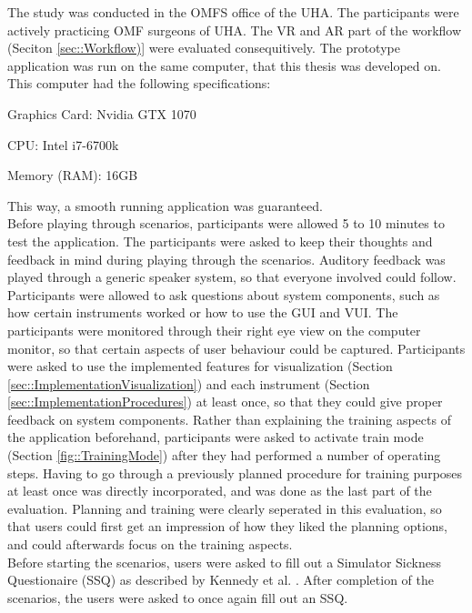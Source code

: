 The study was conducted in the OMFS office of the UHA.
The participants were actively practicing OMF surgeons of UHA.
The VR and AR part of the workflow (Seciton \ref{sec::Workflow)} 
were evaluated consequitively.
The prototype application was run on the same computer, that this 
thesis was developed on.
This computer had the following specifications:

\begin{compactenum}[label=(\alph*)]
    \item Graphics Card: Nvidia GTX 1070
    \item CPU: Intel i7-6700k
    \item Memory (RAM): 16GB
\end{compactenum}

This way, a smooth running application was guaranteed.
\\ Before playing through scenarios, participants were allowed 5 to 10 minutes to test the application.
The participants were asked to keep their thoughts and feedback in mind during playing through the scenarios.
Auditory feedback was played through a generic speaker system, so that everyone involved could follow.
Participants were allowed to ask questions about system components, such as how certain instruments worked or how to use the GUI and VUI.
The participants were monitored through their right eye view on the computer monitor, so that certain aspects of user behaviour could be captured.
Participants were asked to use the implemented features for visualization (Section \ref{sec::ImplementationVisualization}) and each instrument (Section \ref{sec::ImplementationProcedures}) 
at least once, so that they could give proper feedback on system components.
Rather than explaining the training aspects of the application beforehand, participants were asked to activate train mode (Section \ref{fig::TrainingMode}) after they had performed a number 
of operating steps.
Having to go through a previously planned procedure for training purposes at least once was directly incorporated, and was done as the last part of the evaluation.
Planning and training were clearly seperated in this evaluation, so that users could first get an impression of how they liked the planning options, and could afterwards focus on the training aspects.
\\ Before starting the scenarios, users were asked to fill out a Simulator Sickness Questionaire (SSQ) as described by Kennedy et al. \cite{kennedy1993simulator}.
After completion of the scenarios, the users were asked to once again fill out an SSQ.

